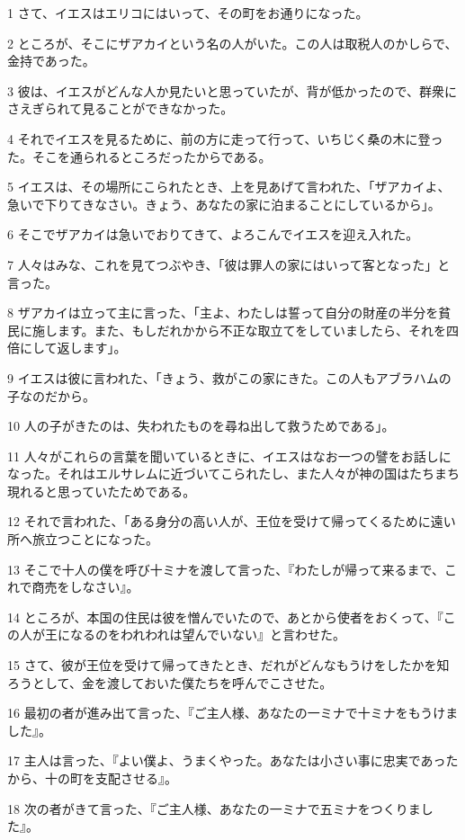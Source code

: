 \par 1 さて、イエスはエリコにはいって、その町をお通りになった。
\par 2 ところが、そこにザアカイという名の人がいた。この人は取税人のかしらで、金持であった。
\par 3 彼は、イエスがどんな人か見たいと思っていたが、背が低かったので、群衆にさえぎられて見ることができなかった。
\par 4 それでイエスを見るために、前の方に走って行って、いちじく桑の木に登った。そこを通られるところだったからである。
\par 5 イエスは、その場所にこられたとき、上を見あげて言われた、「ザアカイよ、急いで下りてきなさい。きょう、あなたの家に泊まることにしているから」。
\par 6 そこでザアカイは急いでおりてきて、よろこんでイエスを迎え入れた。
\par 7 人々はみな、これを見てつぶやき、「彼は罪人の家にはいって客となった」と言った。
\par 8 ザアカイは立って主に言った、「主よ、わたしは誓って自分の財産の半分を貧民に施します。また、もしだれかから不正な取立てをしていましたら、それを四倍にして返します」。
\par 9 イエスは彼に言われた、「きょう、救がこの家にきた。この人もアブラハムの子なのだから。
\par 10 人の子がきたのは、失われたものを尋ね出して救うためである」。
\par 11 人々がこれらの言葉を聞いているときに、イエスはなお一つの譬をお話しになった。それはエルサレムに近づいてこられたし、また人々が神の国はたちまち現れると思っていたためである。
\par 12 それで言われた、「ある身分の高い人が、王位を受けて帰ってくるために遠い所へ旅立つことになった。
\par 13 そこで十人の僕を呼び十ミナを渡して言った、『わたしが帰って来るまで、これで商売をしなさい』。
\par 14 ところが、本国の住民は彼を憎んでいたので、あとから使者をおくって、『この人が王になるのをわれわれは望んでいない』と言わせた。
\par 15 さて、彼が王位を受けて帰ってきたとき、だれがどんなもうけをしたかを知ろうとして、金を渡しておいた僕たちを呼んでこさせた。
\par 16 最初の者が進み出て言った、『ご主人様、あなたの一ミナで十ミナをもうけました』。
\par 17 主人は言った、『よい僕よ、うまくやった。あなたは小さい事に忠実であったから、十の町を支配させる』。
\par 18 次の者がきて言った、『ご主人様、あなたの一ミナで五ミナをつくりました』。
